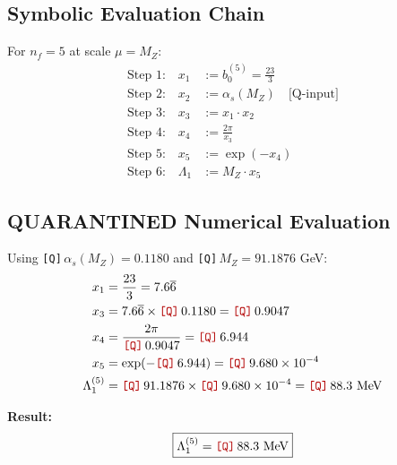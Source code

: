 \documentclass[11pt,a4paper]{article}
\newcommand{\Qnum}[1]{\textcolor{red!70!black}{\texttt{[Q]}}\,#1}
\theoremstyle{definition}
\begin{document}
\subsection{Symbolic Evaluation Chain}
\label{subsec:lambda1-chain}

For $n_f = 5$ at scale $\mu = M_Z$:
\begin{align}
\label{eq:lambda1-step1}
\text{Step 1:} \quad x_1 &:= b_0^{(5)} = \frac{23}{3} \\
\label{eq:lambda1-step2}
\text{Step 2:} \quad x_2 &:= \alpha_s(M_Z) \quad \text{[Q-input]} \\
\label{eq:lambda1-step3}
\text{Step 3:} \quad x_3 &:= x_1 \cdot x_2 \\
\label{eq:lambda1-step4}
\text{Step 4:} \quad x_4 &:= \frac{2\pi}{x_3} \\
\label{eq:lambda1-step5}
\text{Step 5:} \quad x_5 &:= \exp(-x_4) \\
\label{eq:lambda1-step6}
\text{Step 6:} \quad \Lambda_1 &:= M_Z \cdot x_5
\end{align}

\subsection{QUARANTINED Numerical Evaluation}
\label{subsec:lambda1-numerical}

\begin{quarantinebox}
Using \Qnum{$\alpha_s(M_Z) = 0.1180$} and \Qnum{$M_Z = 91.1876$ GeV}:
\begin{align}
\label{eq:lambda1-num1}
x_1 &= \frac{23}{3} = 7.6\overline{6} \\
\label{eq:lambda1-num2}
x_3 &= 7.6\overline{6} \times \Qnum{0.1180} = \Qnum{0.9047} \\
\label{eq:lambda1-num3}
x_4 &= \frac{2\pi}{\Qnum{0.9047}} = \Qnum{6.944} \\
\label{eq:lambda1-num4}
x_5 &= \exp(-\Qnum{6.944}) = \Qnum{9.680 \times 10^{-4}} \\
\label{eq:lambda1-num5}
\Lambda_1^{(5)} &= \Qnum{91.1876} \times \Qnum{9.680 \times 10^{-4}} = \Qnum{88.3} \text{ MeV}
\end{align}

\textbf{Result:}
\begin{equation}
\label{eq:lambda1-result}
\boxed{\Lambda_1^{(5)} = \Qnum{88.3} \text{ MeV}}
\end{equation}
\end{quarantinebox}
\end{document}
